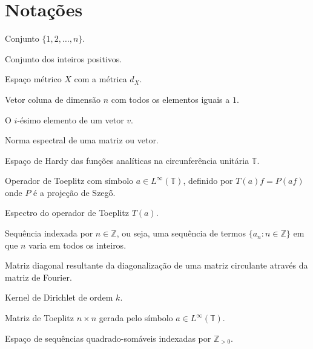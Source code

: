 \section*{Notações}

\begin{description}[leftmargin=!, labelwidth=\widthof{\texttt{Função $f : X \to Y$}}]
  \item[{$[n]$}] Conjunto $\{1, 2, \dots, n\}$.

  \item[$\mathbb{Z}_{>0}$] Conjunto dos inteiros positivos.

  \item[$(X, d_X)$] Espaço métrico $X$ com a métrica $d_X$.

  \item[$\mathbf{1}_n$] Vetor coluna de dimensão $n$ com todos os elementos iguais a $1$.

  \item[$(v)_i$] O $i$-ésimo elemento de um vetor $v$.

  \item[$\| \cdot \|_2$] Norma espectral de uma matriz ou vetor.

  \item[$H^2(\mathbb{T})$] Espaço de Hardy das funções analíticas na circunferência unitária $\mathbb{T}$.

  \item[$T(a)$] Operador de Toeplitz com símbolo $a \in L^\infty(\mathbb{T})$, definido por $T(a)f = P(af)$ onde $P$ é a projeção de Szegő.

  \item[$\sigma(T(a))$] Espectro do operador de Toeplitz $T(a)$.

  \item[$\{a_n\}$] Sequência indexada por \( n \in \mathbb{Z} \), ou seja, uma sequência de termos \( \{a_n : n \in \mathbb{Z}\} \) em que \( n \) varia em todos os inteiros.

  \item[$\Lambda$] Matriz diagonal resultante da diagonalização de uma matriz circulante através da matriz de Fourier.

  \item[$D_k(t)$] Kernel de Dirichlet de ordem $k$.

  \item[$T_n(a)$] Matriz de Toeplitz $n \times n$ gerada pelo símbolo $a \in L^\infty(\mathbb{T})$.

  \item[$l^2(\mathbb{Z}_{> 0})$] Espaço de sequências quadrado-somáveis indexadas por $\mathbb{Z}_{> 0}$.


\end{description}
